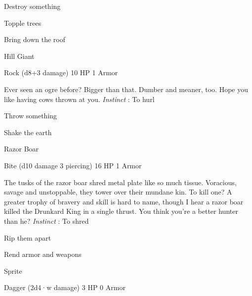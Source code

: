 \startitemize[1,packed]

\item Destroy something

 
\item Topple trees

 
\item Bring down the roof


\stopitemize
 
\startMonsterName
Hill Giant	 
\stopMonsterName
 

Rock (d8+3 damage)	10 HP	1 Armor

 


 
\startMonsterDescription
Ever seen an ogre before? Bigger than that. Dumber and meaner, too. Hope you like having cows thrown at you. {\em Instinct} : To hurl
\stopMonsterDescription
 
\startitemize[1,packed]

\item Throw something

 
\item Shake the earth


\stopitemize
 
\startMonsterName
Razor Boar	 
\stopMonsterName
 

Bite (d10 damage 3 piercing)	16 HP	1 Armor

 


 
\startMonsterDescription
The tusks of the razor boar shred metal plate like so much tissue. Voracious, savage and unstoppable, they tower over their mundane kin. To kill one? A greater trophy of bravery and skill is hard to name, though I hear a razor boar killed the Drunkard King in a single thrust. You think you’re a better hunter than he? {\em Instinct} : To shred
\stopMonsterDescription
 
\startitemize[1,packed]

\item Rip them apart

 
\item Rend armor and weapons


\stopitemize
 
\startMonsterName
Sprite	 
\stopMonsterName
 

Dagger (2d4·w damage)	3 HP	0 Armor

